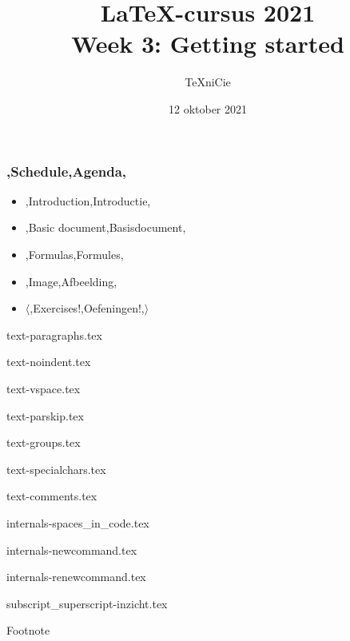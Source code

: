\documentclass{cursuspresentatie}
\title[LaTeX-cursus 2021 -- Week 3]{%
	\texorpdfstring{\LaTeX{}-cursus 2021\\Week 3: Getting started}{%
		Week 3 -- LaTeX-cursus 2021%
	}%
}
\author{\TeX niCie}
\date{12 oktober 2021}
\def\importslide#1#2{%
	{#2}
}
\begin{document}


\begin{frame}
	\titlepage
	\centering
\end{frame}

\begin{frame}
	\frametitle{\lang,Schedule,Agenda,}
	
	\begin{itemize}
		\item \lang,Introduction,Introductie,
		\item \lang,Basic document,Basisdocument,
		\item \lang,Formulas,Formules,
		\item \lang,Image,Afbeelding,
		\item $ \mathbf\langle $\lang,Exercises!,Oefeningen!,$ \rangle $
	\end{itemize}
\end{frame}

	\clearrecentlist

    \def\assetdir{assets}

	\importslide{text}{text-paragraphs.tex}

	\importslide{text}{text-noindent.tex}

	\importslide{text}{text-vspace.tex}

	\importslide{text}{text-parskip.tex}

	\importslide{text}{text-groups.tex}

	\importslide{text}{text-specialchars.tex}

	\importslide{text}{text-comments.tex}

	\importslide{internals}{internals-spaces_in_code.tex}

	\importslide{internals}{internals-newcommand.tex}

	\importslide{internals}{internals-renewcommand.tex}

	\importslide{math}{subscript_superscript-inzicht.tex}

	\begin{frame}
		Footnote
	\end{frame}
\end{document}
